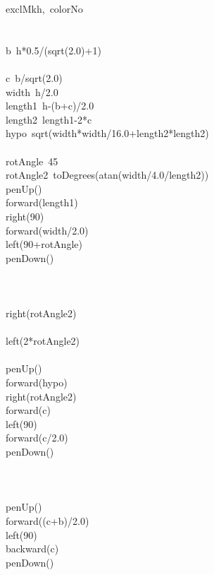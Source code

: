\documentclass[a4paper,10pt]{article}
\begin{document}
\begin{pseudocode}{exclMk}{h,\ colorNo }
\label{exclMk}
\\
\\
  \\
  b\gets\ h*0.5/(sqrt(2.0)+1)\\
  \\
  c\gets\ b/sqrt(2.0)\\
  width\gets\ h/2.0\\
  length1\gets\ h-(b+c)/2.0\\
  length2\gets\ length1-2*c\\
  hypo\gets\ sqrt(width*width/16.0+length2*length2)\\
  \\
  rotAngle\gets\ 45\\
  rotAngle2\gets\ toDegrees(atan(width/4.0/length2))\\
  penUp()\\
  forward(length1)\\
  right(90)\\
  forward(width/2.0)\\
  left(90+rotAngle)\\
  penDown()\\
  \\
  \\
  \\
  right(rotAngle2)\\
  \\
  left(2*rotAngle2)\\
  \\
  penUp()\\
  forward(hypo)\\
  right(rotAngle2)\\
  forward(c)\\
  left(90)\\
  forward(c/2.0)\\
  penDown()\\
  \\
  \\
  \\
  penUp()\\
  forward((c+b)/2.0)\\
  left(90)\\
  backward(c)\\
  penDown()\\
\ENDPROCEDURE
\end{pseudocode}
\end{document}
